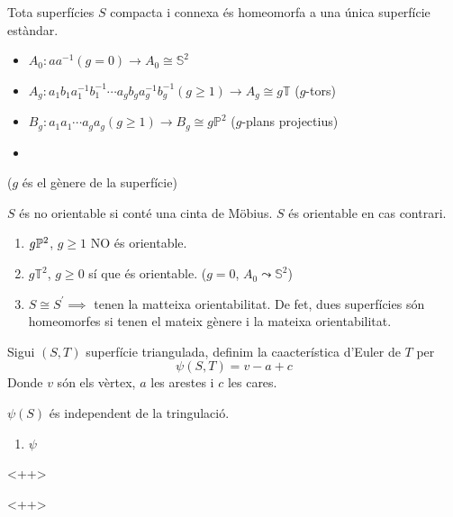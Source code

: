 \begin{teo*}[C]
    Tota superfícies $S$ compacta i connexa és homeomorfa a una única superfície estàndar.
    \begin{itemize}
	\item $A_0 \colon aa^{-1} (g = 0) \rightarrow A_0 \cong \mathbb{S}^2$
	\item $A_g \colon a_1b_1a^{-1}_1 b^{-1}_1 \cdots a_gb_ga^{-1}_gb^{-1}_g (g \geq 1)
	    \rightarrow A_g \cong g \mathbb{T}$ ($g$-tors)
	\item $B_g \colon a_1a_1 \cdots a_ga_g (g \geq 1) \rightarrow B_g \cong g \mathbb{P}^2$
	    ($g$-plans projectius)
	\item
    \end{itemize}
    ($g$ és el gènere de la superfície)
\end{teo*}

\begin{defi}[Orientabilitat]
    $S$ és no orientable si conté una cinta de Möbius. $S$ és orientable en cas contrari.
\end{defi}

\begin{example}
    \begin{enumerate}
	\item $g \mathbb{P}^2$, $g \geq 1$ NO és orientable.
	\item $g \mathbb{T}^2$, $g \geq 0$ sí que és orientable. ($g = 0$, $A_0 \leadsto \mathbb{S}^2$)
	\item $S \cong S^\prime \implies $ tenen la matteixa orientabilitat. De fet, dues superfícies
	    són homeomorfes si tenen el mateix gènere i la mateixa orientabilitat.
    \end{enumerate}
\end{example}

\begin{defi}
    Sigui $(S, T)$ superfície triangulada, definim la caacterística d'Euler de $T$ per
    \[
        \psi (S, T) = v - a + c
    \]
    Donde $v$ són els vèrtex, $a$ les arestes i $c$ les cares.
\end{defi}

\begin{teo*}
    $\psi(S)$ és independent de la tringulació.
\end{teo*}

\begin{example}
    \begin{enumerate}
	\item $\psi$
    \end{enumerate}<++>
\end{example}<++>

